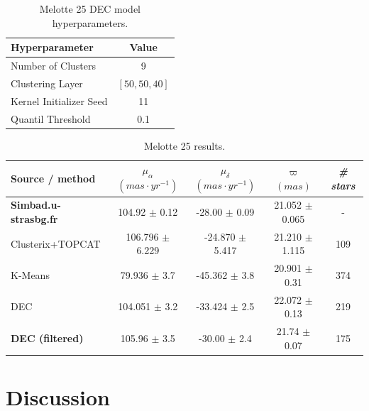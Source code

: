 \documentclass[11pt, a4paper, english]{book}
\begin{document}
\vfill

\begin{table}[h]
  \begin{center}
    \begin{tabular}{l|c}
      \textbf{Hyperparameter} & \textbf{Value} \\
      \hline
      Number of Clusters & 9 \\
      Clustering Layer & \(\left[ 50, 50, 40 \right]\) \\
      Kernel Initializer Seed & 11 \\
      Quantil Threshold & 0.1 \\
    \end{tabular}
    \caption{Melotte 25 DEC model hyperparameters.}
    \label{tab:hyperparameters_melotte_25}
  \end{center}
\end{table}

\vfill

\begin{table}[h]
  \begin{center}
    \begin{tabular}{l|c|c|c|c}
      \textbf{Source / method} & \emph{\(\mu_{\alpha}\) \((mas \cdot yr^{-1})\)} & \emph{\(\mu_{\delta}\) \((mas \cdot yr^{-1})\)}
      & \emph{\( \varpi \) \((mas)\)} & \emph{\# stars} \\
      \hline
      \textbf{Simbad.u-strasbg.fr} & 104.92 \( \pm \) 0.12 & -28.00 \( \pm \) 0.09 & 21.052 \( \pm \) 0.065 & - \\
      Clusterix+TOPCAT & 106.796 \( \pm \) 6.229 & -24.870 \( \pm \) 5.417 & 21.210 \( \pm \) 1.115 & 109 \\
      K-Means & 79.936 \( \pm \) 3.7 & -45.362 \( \pm \) 3.8 & 20.901 \( \pm \) 0.31 & 374 \\
      DEC & 104.051 \( \pm \) 3.2 & -33.424 \( \pm \) 2.5 & 22.072 \( \pm \) 0.13 & 219 \\
      \textbf{DEC (filtered)} & 105.96 \( \pm \) 3.5 & -30.00 \( \pm \) 2.4 & 21.74 \( \pm \) 0.07 & 175 \\
    \end{tabular}
    \caption{Melotte 25 results.}
    \label{tab:results_melotte_25}
  \end{center}
\end{table}

\vfill

\newpage

\section{Discussion}
\end{document}
